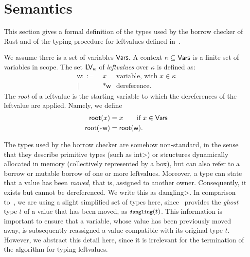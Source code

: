 \section{Semantics}\label{sec:semantics}

This section gives a formal definition of the types used by the borrow checker
of Rust and of the typing procedure for leftvalues defined in~\cite{Pearce21}.

\begin{definition}
  We assume there is a set of variables $\mathsf{Vars}$.
  A context $\kappa\subseteq\mathsf{Vars}$ is a finite set of variables in scope.
  The set $\mathsf{LV}_\kappa$ of \emph{leftvalues} over $\kappa$ is defined as:
  \begin{align*}
    \mathsf{w} ::= &\ x & \text{variable, with $x\in\kappa$}\\
    | &\ \mathtt{*}\mathsf{w} & \text{dereference.}
  \end{align*}
  The \emph{root} of a leftvalue is the starting variable to which the dereferences of the
  leftvalue are applied. Namely, we define
  \begin{align*}
    \mathsf{root}(x) &= x\qquad\text{if $x\in\mathsf{Vars}$}\\
    \mathsf{root}(\mathtt{*}\mathsf{w}) &= \mathsf{root}(\mathsf{w}).
  \end{align*}
\end{definition}

The types used by the borrow checker are somehow non-standard, in the sense
that they describe primitive types (such as \<int>) or structures
dynamically allocated in memory (collectively represented by a box), but can also refer to
a borrow or mutable borrow of one or more leftvalues.
Moreover, a type can state that a value has been \emph{moved}, that is, assigned
to another owner. Consequently, it exists but cannot be dereferenced.
We write this as \<dangling>. In comparison to~\cite{Pearce21}, we are using
a slight simplified set of types here, since~\cite{Pearce21} provides
the \emph{ghost} type $t$ of a value that has been moved, as $\<dangling>(t)$.
This information is important to ensure that a variable, whose value has been
previously moved away, is subsequently reassigned a value compatible
with its original type $t$. However, we abstract this detail here, since it is irrelevant for
the termination of the algorithm for typing leftvalues.

